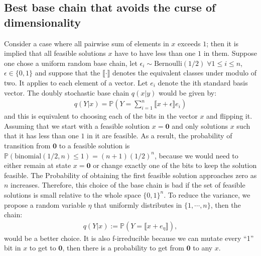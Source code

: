 \documentclass[]{article}
\theoremstyle{definition}
\begin{document}
    \subsection{Best base chain that avoids the curse of dimensionality}
        Consider a case where all pairwise sum of elements in $x$ exceeds $1$; then it is implied that all feasible solutions $x$ have to have less than one $1$ in them. Suppose one chose a uniform random base chain, let $\epsilon_i \sim \text{Bernoulli}(1/2) \; \forall 1 \le i \le n$, $\epsilon \in \{0, 1\}$ and suppose that the $\llbracket\cdot \rrbracket$ denotes the equivalent classes under modulo of two. It applies to each element of a vector. Let $e_i$ denote the ith standard basis vector. The doubly stochastic base chain $q(x|y)$ would be given by: 
        \begin{align*}
           q(Y|x) = \mathbb P\left(
            Y = \sum_{i = 1}^{n} \llbracket x + \epsilon \rrbracket e_i
           \right)
        \end{align*}
        and this is equivalent to choosing each of the bits in the vector $x$ and flipping it. Assuming that we start with a feasible solution $x = \mathbf 0$ and only solutions $x$ such that it has less than one $1$ in it are feasible. As a result, the probability of transition from $\mathbf 0$ to a feasible solution is $\mathbb P (\text{binomial}(1/2, n) \le 1) = (n + 1)(1/2)^{n}$, because we would need to either remain at state $x = \mathbf 0$ or change exactly one of the bits to keep the solution feasible. The Probability of obtaining the first feasible solution approaches zero as $n$ increases. Therefore, this choice of the base chain is bad if the set of feasible solutions is small relative to the whole space $\{0, 1\}^n$. To reduce the variance, we propose a random variable $\eta$ that uniformly distributes in $\{1, \cdots, n\}$, then the chain: 
        \begin{align*}
            q(Y|x) := \mathbb P(Y=\llbracket x + e_\eta\rrbracket),
        \end{align*}
        would be a better choice. It is also f-irreducible because we can mutate every ``1'' bit in $x$ to get to $\mathbf 0$, then there is a probability to get from $\mathbf 0$ to any $x$. 
\end{document}
